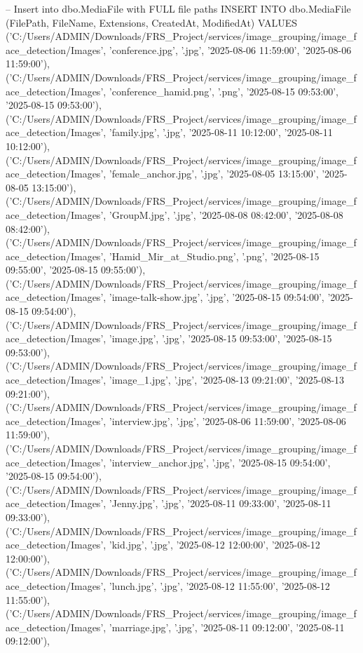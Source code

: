 -- Insert into dbo.MediaFile with FULL file paths
INSERT INTO dbo.MediaFile (FilePath, FileName, Extensions, CreatedAt, ModifiedAt)
VALUES
('C:/Users/ADMIN/Downloads/FRS_Project/services/image_grouping/image_face_detection/Images', 'conference.jpg', '.jpg', '2025-08-06 11:59:00', '2025-08-06 11:59:00'),
('C:/Users/ADMIN/Downloads/FRS_Project/services/image_grouping/image_face_detection/Images', 'conference_hamid.png', '.png', '2025-08-15 09:53:00', '2025-08-15 09:53:00'),
('C:/Users/ADMIN/Downloads/FRS_Project/services/image_grouping/image_face_detection/Images', 'family.jpg', '.jpg', '2025-08-11 10:12:00', '2025-08-11 10:12:00'),
('C:/Users/ADMIN/Downloads/FRS_Project/services/image_grouping/image_face_detection/Images', 'female_anchor.jpg', '.jpg', '2025-08-05 13:15:00', '2025-08-05 13:15:00'),
('C:/Users/ADMIN/Downloads/FRS_Project/services/image_grouping/image_face_detection/Images', 'GroupM.jpg', '.jpg', '2025-08-08 08:42:00', '2025-08-08 08:42:00'),
('C:/Users/ADMIN/Downloads/FRS_Project/services/image_grouping/image_face_detection/Images', 'Hamid_Mir_at_Studio.png', '.png', '2025-08-15 09:55:00', '2025-08-15 09:55:00'),
('C:/Users/ADMIN/Downloads/FRS_Project/services/image_grouping/image_face_detection/Images', 'image-talk-show.jpg', '.jpg', '2025-08-15 09:54:00', '2025-08-15 09:54:00'),
('C:/Users/ADMIN/Downloads/FRS_Project/services/image_grouping/image_face_detection/Images', 'image.jpg', '.jpg', '2025-08-15 09:53:00', '2025-08-15 09:53:00'),
('C:/Users/ADMIN/Downloads/FRS_Project/services/image_grouping/image_face_detection/Images', 'image_1.jpg', '.jpg', '2025-08-13 09:21:00', '2025-08-13 09:21:00'),
('C:/Users/ADMIN/Downloads/FRS_Project/services/image_grouping/image_face_detection/Images', 'interview.jpg', '.jpg', '2025-08-06 11:59:00', '2025-08-06 11:59:00'),
('C:/Users/ADMIN/Downloads/FRS_Project/services/image_grouping/image_face_detection/Images', 'interview_anchor.jpg', '.jpg', '2025-08-15 09:54:00', '2025-08-15 09:54:00'),
('C:/Users/ADMIN/Downloads/FRS_Project/services/image_grouping/image_face_detection/Images', 'Jenny.jpg', '.jpg', '2025-08-11 09:33:00', '2025-08-11 09:33:00'),
('C:/Users/ADMIN/Downloads/FRS_Project/services/image_grouping/image_face_detection/Images', 'kid.jpg', '.jpg', '2025-08-12 12:00:00', '2025-08-12 12:00:00'),
('C:/Users/ADMIN/Downloads/FRS_Project/services/image_grouping/image_face_detection/Images', 'lunch.jpg', '.jpg', '2025-08-12 11:55:00', '2025-08-12 11:55:00'),
('C:/Users/ADMIN/Downloads/FRS_Project/services/image_grouping/image_face_detection/Images', 'marriage.jpg', '.jpg', '2025-08-11 09:12:00', '2025-08-11 09:12:00'),
